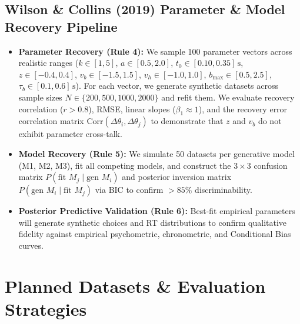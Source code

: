 \documentclass[10pt,a4paper]{article}
\begin{document}
\subsection{Wilson \& Collins (2019) Parameter \& Model Recovery Pipeline}
\begin{itemize}
    \item \textbf{Parameter Recovery (Rule 4):} We sample 100 parameter vectors across realistic ranges ($k \in [1, 5]$, $a \in [0.5, 2.0]$, $t_0 \in [0.10, 0.35]\,\text{s}$, $z \in [-0.4, 0.4]$, $v_b \in [-1.5, 1.5]$, $v_h \in [-1.0, 1.0]$, $b_{\max} \in [0.5, 2.5]$, $\tau_b \in [0.1, 0.6]\,\text{s}$). For each vector, we generate synthetic datasets across sample sizes $N \in \{200, 500, 1000, 2000\}$ and refit them. We evaluate recovery correlation ($r > 0.8$), RMSE, linear slopes ($\beta_1 \approx 1$), and the recovery error correlation matrix $\text{Corr}(\Delta \theta_i, \Delta \theta_j)$ to demonstrate that $z$ and $v_b$ do not exhibit parameter cross-talk.
    \item \textbf{Model Recovery (Rule 5):} We simulate 50 datasets per generative model (M1, M2, M3), fit all competing models, and construct the $3 \times 3$ confusion matrix $P(\text{fit } M_j \mid \text{gen } M_i)$ and posterior inversion matrix $P(\text{gen } M_i \mid \text{fit } M_j)$ via BIC to confirm $>85\%$ discriminability.
    \item \textbf{Posterior Predictive Validation (Rule 6):} Best-fit empirical parameters will generate synthetic choices and RT distributions to confirm qualitative fidelity against empirical psychometric, chronometric, and Conditional Bias curves.
\end{itemize}

\section{Planned Datasets \& Evaluation Strategies}
\end{document}
